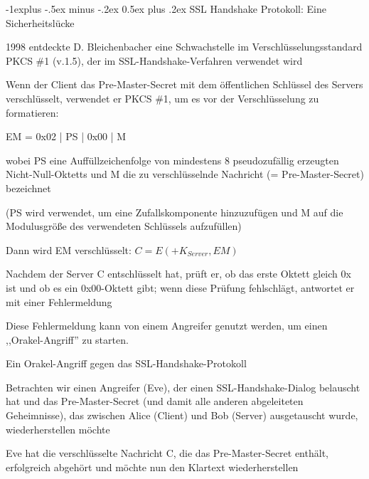 \documentclass[a4paper]{article}
\makeatletter
\renewcommand{\subsection}{\@startsection{subsection}{2}{0mm}%
 {-1explus -.5ex minus -.2ex}%
 {0.5ex plus .2ex}%
 {\normalfont\normalsize\bfseries}}
\makeatother
\begin{document}
\begin{multicols}{3}
      \subsection{SSL Handshake Protokoll: Eine Sicherheitslücke}
      \begin{itemize*}
            \item 1998 entdeckte D. Bleichenbacher eine Schwachstelle im Verschlüsselungsstandard PKCS \#1 (v.1.5), der im SSL-Handshake-Verfahren verwendet wird
            \item Wenn der Client das Pre-Master-Secret mit dem öffentlichen Schlüssel des Servers verschlüsselt, verwendet er PKCS \#1, um es vor der Verschlüsselung zu formatieren:
            \begin{itemize*}
                  \item EM = 0x02 | PS | 0x00 | M
                  \begin{itemize*}
                        \item wobei PS eine Auffüllzeichenfolge von mindestens 8 pseudozufällig erzeugten Nicht-Null-Oktetts und M die zu verschlüsselnde Nachricht (= Pre-Master-Secret) bezeichnet
                        \item (PS wird verwendet, um eine Zufallskomponente hinzuzufügen und M auf die Modulusgröße des verwendeten Schlüssels aufzufüllen)
                  \end{itemize*}
                  \item Dann wird EM verschlüsselt: $C = E(+K_{Server}, EM)$
                  \item Nachdem der Server C entschlüsselt hat, prüft er, ob das erste Oktett gleich 0x ist und ob es ein 0x00-Oktett gibt; wenn diese Prüfung fehlschlägt, antwortet er mit einer Fehlermeldung
                  \item Diese Fehlermeldung kann von einem Angreifer genutzt werden, um einen ,,Orakel-Angriff'' zu starten.
            \end{itemize*}
            \item Ein Orakel-Angriff gegen das SSL-Handshake-Protokoll
            \begin{itemize*}
                  \item Betrachten wir einen Angreifer (Eve), der einen SSL-Handshake-Dialog belauscht hat und das Pre-Master-Secret (und damit alle anderen abgeleiteten Geheimnisse), das zwischen Alice (Client) und Bob (Server) ausgetauscht wurde, wiederherstellen möchte
                  \item Eve hat die verschlüsselte Nachricht C, die das Pre-Master-Secret enthält, erfolgreich abgehört und möchte nun den Klartext wiederherstellen

\end{itemize*}
\end{itemize*}
\end{multicols}
\end{document}
